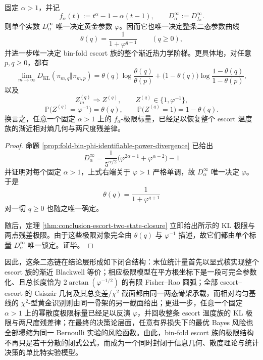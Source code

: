 \begin{theorem}\label{thm:conclusion-powerdiv-scalar-recovers-escort-thermo-ladder}
固定 \(\alpha>1\)，并记
\[
f_\alpha(t):=t^\alpha-1-\alpha(t-1),
\qquad
D_\alpha^\infty:=D_{f_\alpha}^\infty.
\]
则单个实数 \(D_\alpha^\infty\) 唯一决定黄金参数 \(\varphi\)。因而它也唯一决定整条二态参数曲线
\[
\theta(q)=\frac{1}{1+\varphi^{q+1}}
\qquad (q\ge 0),
\]
并进一步唯一决定 bin-fold escort 族的整个渐近热力学阶梯。更具体地，对任意 \(p,q\ge 0\)，都有
\[
\lim_{m\to\infty}D_{\mathrm{KL}}(\pi_{m,q}\Vert \pi_{m,p})
=
\theta(q)\log\frac{\theta(q)}{\theta(p)}
+
\bigl(1-\theta(q)\bigr)\log\frac{1-\theta(q)}{1-\theta(p)},
\]
以及
\[
Z_m^{(q)}\Rightarrow Z^{(q)},
\qquad
Z^{(q)}\in\{1,\varphi^{-1}\},
\]
\[
\mathbb P\bigl(Z^{(q)}=\varphi^{-1}\bigr)=\theta(q),
\qquad
\mathbb P\bigl(Z^{(q)}=1\bigr)=1-\theta(q).
\]
换言之，任意一个固定 \(\alpha>1\) 上的 \(f_\alpha\)-极限标量，已经足以恢复整个 escort 温度族的渐近相对熵几何与两尺度残差律。
\end{theorem}
\begin{proof}
命题 \ref{prop:fold-bin-phi-identifiable-power-divergence} 已给出
\[
D_\alpha^\infty
=
\frac{1}{5^{\alpha/2}}
\bigl(\varphi^{2\alpha-1}+\varphi^{\alpha-2}\bigr)-1
\]
并证明对每个固定 \(\alpha>1\)，上式右端关于 \(\varphi>1\) 严格单调，故 \(D_\alpha^\infty\) 唯一决定 \(\varphi\)。于是
\[
\theta(q)=\frac{1}{1+\varphi^{q+1}}
\]
对一切 \(q\ge 0\) 也随之唯一确定。

随后，定理 \ref{thm:conclusion-escort-two-state-closure} 立即给出所示的 KL 极限与两点残差极限。由于这些极限对象完全由 \(\theta(q)\) 与 \(\varphi^{-1}\) 描述，故它们都由单个标量 \(D_\alpha^\infty\) 唯一锁定。证毕。
\end{proof}

\noindent
因此，这条二态链在结论层形成如下闭合结构：末位统计量首先以显式核实现整个 escort 族的渐近 Blackwell 等价；相应极限模型在平方根坐标下是一段可完全参数化、且总长度恰为 \(2\arctan(\varphi^{-1/2})\) 的有限 Fisher--Rao 圆弧；全部 escort--escort 的 Csiszár 几何及其总变差/\(\chi^2\) 截面都由同一两态骨架承载，而相对均匀基线的 \(\chi^2\)-型黄金识别则由同一骨架的另一截面给出；更进一步，任意一个固定 \(\alpha>1\) 上的幂散度极限标量已经足以反演 \(\varphi\)，并回收整条 escort 温度族的 KL 极限与两尺度残差律；在最终的决策论层面，任意有界损失下的最优 Bayes 风险也全部塌缩为同一 Bernoulli 实验的风险函数。由此，bin-fold escort 族的极限结构不再只是若干分散的闭式公式，而成为一个同时封闭于信息几何、散度理论与统计决策的单比特实验模型。

\endinput
